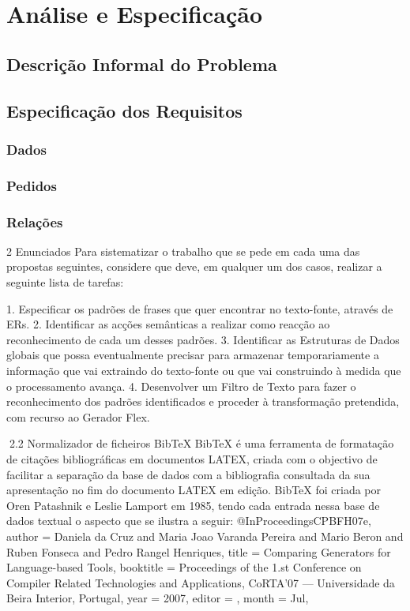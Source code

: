 \chapter{Análise e Especificação}
\label{ae}
\section{Descrição Informal do Problema}



\section{Especificação dos Requisitos}

\subsection{Dados}

\subsection{Pedidos}

\subsection{Relações}



2     Enunciados
Para sistematizar o trabalho que se pede em cada uma das propostas seguintes, considere que deve, em qualquer um
dos casos, realizar a seguinte lista de tarefas:

    1. Especificar os padrões de frases que quer encontrar no texto-fonte, através de ERs.
    2. Identificar as acções semânticas a realizar como reacção ao reconhecimento de cada um desses padrões.
    3. Identificar as Estruturas de Dados globais que possa eventualmente precisar para armazenar temporariamente a
       informação que vai extraindo do texto-fonte ou que vai construindo à medida que o processamento avança.
    4. Desenvolver um Filtro de Texto para fazer o reconhecimento dos padrões identificados e proceder à transformação
       pretendida, com recurso ao Gerador Flex.

2.2    Normalizador de ficheiros BibTeX
BibTeX é uma ferramenta de formatação de citações bibliográficas em documentos LATEX, criada com o objectivo de
facilitar a separação da base de dados com a bibliografia consultada da sua apresentação no fim do documento LATEX
em edição. BibTeX foi criada por Oren Patashnik e Leslie Lamport em 1985, tendo cada entrada nessa base de dados
textual o aspecto que se ilustra a seguir:
@InProceedings{CPBFH07e,
  author =    {Daniela da Cruz and Maria Joao Varanda Pereira
               and Mario Beron and Ruben Fonseca and
               Pedro Rangel Henriques},
  title =     {Comparing Generators for Language-based Tools},
  booktitle = {Proceedings of the 1.st Conference on Compiler
               Related Technologies and Applications, CoRTA’07
               --- Universidade da Beira Interior, Portugal},
  year =      {2007},
  editor =    {},
  month =     {Jul},
}

